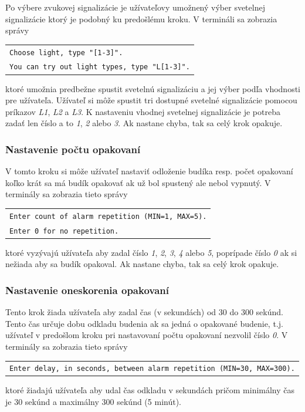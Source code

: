 \documentclass[11pt,a4paper]{article}
\begin{document}
            \indent Po výbere zvukovej signalizácie je užívateľovy umožnený výber svetelnej signalizácie ktorý je podobný ku predošlému kroku. V termináli sa zobrazia správy
            \begin{center}
                \begin{tabular}{l}
                    \texttt{Choose light, type "[1-3]".}\\
                    \texttt{You can try out light types, type "L[1-3]".}
                \end{tabular}
            \end{center}
            ktoré umožnia predbežne spustit svetelnú signalizáciu a jej výber podľa vhodnosti pre užívateľa. Užívateľ si môže spustit tri dostupné svetelné signalizácie pomocou príkazov \textit{L1}, \textit{L2} a \textit{L3}. K nastaveniu vhodnej svetelnej signalizácie je potreba zadať len číslo a to \textit{1}, \textit{2} alebo \textit{3}. Ak nastane chyba, tak sa celý krok opakuje.

        \subsubsection{Nastavenie počtu opakovaní}

            \indent V tomto kroku si môže užívateľ nastaviť odloženie budíka resp. počet opakovaní koľko krát sa má budík opakovať ak už bol spustený ale nebol vypnutý. V terminály sa zobrazia tieto správy
            \begin{center}
                \begin{tabular}{l}
                    \texttt{Enter count of alarm repetition (MIN=1, MAX=5).}\\
                    \texttt{Enter 0 for no repetition.}
                \end{tabular}
            \end{center}
            ktoré vyzývajú užívateľa aby zadal číslo \textit{1}, \textit{2}, \textit{3}, \textit{4} alebo \textit{5}, poprípade číslo \textit{0} ak si nežiada aby sa budík opakoval. Ak nastane chyba, tak sa celý krok opakuje.

        \subsubsection{Nastavenie oneskorenia opakovaní}

            \indent Tento krok žiada užívateľa aby zadal čas (v sekundách) od 30 do 300 sekúnd. Tento čas určuje dobu odkladu budenia ak sa jedná o opakované budenie, t.j. užívateľ v predošlom kroku pri nastavovaní počtu opakovaní nezvolil číslo \textit{0}. V terminály sa zobrazia tieto správy
            \begin{center}
                \begin{tabular}{l}
                    \texttt{Enter delay, in seconds, between alarm repetition (MIN=30, MAX=300).}
                \end{tabular}
            \end{center}
            ktoré žiadajú užívateľa aby udal čas odkladu v sekundách pričom minimálny čas je 30 sekúnd a maximálny 300 sekúnd (5 minút).
\end{document}
